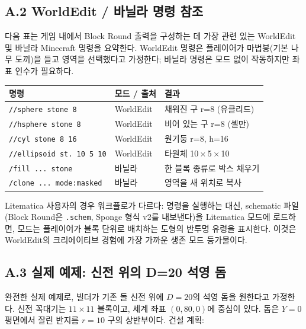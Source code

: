 \documentclass[12pt,a4paper]{scrartcl}
\newcommand{\code}[1]{\texttt{\small #1}}
\newcommand{\cmd}[1]{\textcolor{earth}{\texttt{\small #1}}}
\begin{document}
\subsection*{A.2 WorldEdit / 바닐라 명령 참조}
다음 표는 게임 내에서 Block Round 출력을 구성하는 데 가장 관련 있는 WorldEdit 및 바닐라 Minecraft 명령을 요약한다. WorldEdit 명령은 플레이어가 마법봉(기본 나무 도끼)을 들고 영역을 선택했다고 가정한다; 바닐라 명령은 모드 없이 작동하지만 좌표 인수가 필요하다.

\vspace{0.4em}
\begin{center}
\small
\begin{tabularx}{\textwidth}{@{}llX@{}}
\toprule
\textbf{명령} & \textbf{모드 / 출처} & \textbf{결과} \\
\midrule
\cmd{//sphere stone 8}     & WorldEdit & 채워진 구 r=8 (유클리드)  \\
\cmd{//hsphere stone 8}    & WorldEdit & 비어 있는 구 r=8 (셸만)  \\
\cmd{//cyl stone 8 16}     & WorldEdit & 원기둥 r=8, h=16  \\
\cmd{//ellipsoid st. 10 5 10} & WorldEdit & 타원체 10\,$\times$\,5\,$\times$\,10  \\
\cmd{/fill ... stone}      & 바닐라 & 한 블록 종류로 박스 채우기  \\
\cmd{/clone ... mode:masked} & 바닐라 & 영역을 새 위치로 복사  \\
\bottomrule
\end{tabularx}
\end{center}

Litematica 사용자의 경우 워크플로가 다르다: 명령을 실행하는 대신, schematic 파일(Block Round은 \code{.schem}, Sponge 형식 v2를 내보낸다)을 Litematica 모드에 로드하면, 모드는 플레이어가 블록 단위로 배치하는 도형의 반투명 유령을 표시한다. 이것은 WorldEdit의 크리에이티브 경험에 가장 가까운 생존 모드 등가물이다.

\subsection*{A.3 실제 예제: 신전 위의 D=20 석영 돔}
완전한 실제 예제로, 빌더가 기존 돌 신전 위에 $D=20$의 석영 돔을 원한다고 가정한다. 신전 꼭대기는 $11 \times 11$ 블록이고, 세계 좌표 $(0,80,0)$에 중심이 있다. 돔은 $Y=0$ 평면에서 잘린 반지름 $r=10$ 구의 상반부이다. 건설 계획:
\end{document}
